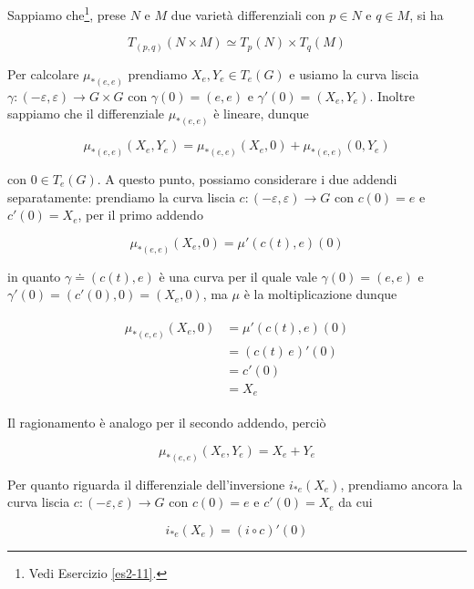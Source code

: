 Sappiamo che\footnote{%
	Vedi Esercizio \ref{es2-11}.%
}, prese $ N $ e $ M $ due varietà differenziali con $ p \in N $ e $ q \in M $, si ha

\begin{equation}
	T_{(p,q)}(N \times M) \simeq T_{p}(N) \times T_{q}(M)
\end{equation}

Per calcolare $ \mu_{*(e,e)} $ prendiamo $ X_{e},Y_{e} \in T_{e}(G) $ e usiamo la curva liscia $ \gamma : (-\varepsilon,\varepsilon) \to G \times G $ con $ \gamma(0)=(e,e) $ e $ \gamma'(0) = (X_{e},Y_{e}) $. Inoltre sappiamo che il differenziale $ \mu_{*(e,e)} $ è lineare, dunque

\begin{equation}
	\mu_{*(e,e)}(X_{e},Y_{e}) = \mu_{*(e,e)}(X_{e},0) + \mu_{*(e,e)}(0,Y_{e})
\end{equation}

con $ 0 \in T_{e}(G) $. A questo punto, possiamo considerare i due addendi separatamente: prendiamo la curva liscia $ c : (-\varepsilon,\varepsilon) \to G $ con $ c(0)=e $ e $ c'(0) = X_{e} $, per il primo addendo

\begin{equation}
	\mu_{*(e,e)}(X_{e},0) = \mu'(c(t),e)(0)
\end{equation}

in quanto $ \gamma \doteq (c(t),e) $ è una curva per il quale vale $ \gamma(0) = (e,e) $ e $ \gamma'(0) = (c'(0),0) = (X_{e},0) $, ma $ \mu $ è la moltiplicazione dunque

\begin{align}
	\begin{split}
		\mu_{*(e,e)}(X_{e},0) &= \mu'(c(t),e)(0)\\
		&= (c(t) \, e)'(0)\\
		&= c'(0)\\
		&= X_{e}
	\end{split}
\end{align}

Il ragionamento è analogo per il secondo addendo, perciò

\begin{equation}
	\mu_{*(e,e)}(X_{e},Y_{e}) = X_{e} + Y_{e}
\end{equation}

Per quanto riguarda il differenziale dell'inversione $ i_{*e}(X_{e}) $, prendiamo ancora la curva liscia $ c : (-\varepsilon,\varepsilon) \to G $ con $ c(0)=e $ e $ c'(0) = X_{e} $ da cui

\begin{equation}
	i_{*e}(X_{e}) = (i \circ c)'(0)
\end{equation}

